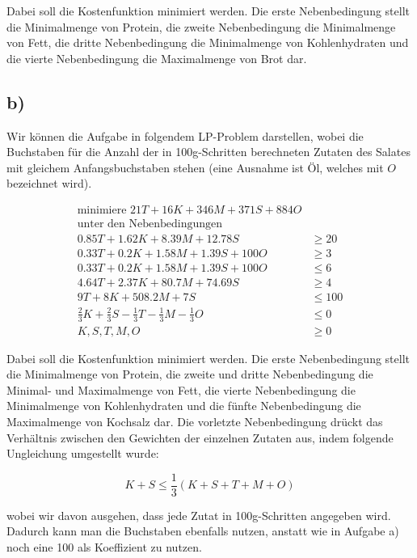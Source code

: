 \documentclass{article}
\begin{document}
Dabei soll die Kostenfunktion minimiert werden. Die erste Nebenbedingung stellt die Minimalmenge von Protein, die zweite Nebenbedingung die Minimalmenge von Fett, die dritte Nebenbedingung die Minimalmenge von Kohlenhydraten und die vierte Nebenbedingung die Maximalmenge von Brot dar.


\subsection*{b)}
Wir können die Aufgabe in folgendem LP-Problem darstellen, wobei die Buchstaben für die Anzahl der in 100g-Schritten berechneten Zutaten des Salates mit gleichem Anfangsbuchstaben stehen (eine Ausnahme ist Öl, welches mit $O$ bezeichnet wird).

\begin{align*}
	\text{minimiere } 21T + 16K + 346M + 371S + 884O\\
	\text{unter den Nebenbedingungen}\\
	0.85T + 1.62K + 8.39M + 12.78S &\geq 20\\
	0.33T + 0.2K + 1.58M + 1.39S + 100O &\geq 3\\
	0.33T + 0.2K + 1.58M + 1.39S + 100O &\leq 6\\
	4.64T + 2.37K + 80.7M + 74.69S &\geq 4\\
	9T + 8K + 508.2M + 7S &\leq 100\\
	\frac{2}{3}K + \frac{2}{3}S - \frac{1}{3}T - \frac{1}{3}M - \frac{1}{3}O &\leq 0\\
	K, S, T, M, O &\geq 0
\end{align*}

Dabei soll die Kostenfunktion minimiert werden. Die erste Nebenbedingung stellt die Minimalmenge von Protein, die zweite und dritte Nebenbedingung die Minimal- und Maximalmenge von Fett, die vierte Nebenbedingung die Minimalmenge von Kohlenhydraten und die fünfte Nebenbedingung die Maximalmenge von Kochsalz dar. Die vorletzte Nebenbedingung drückt das Verhältnis zwischen den Gewichten der einzelnen Zutaten aus, indem folgende Ungleichung umgestellt wurde:

$$K + S \leq \frac{1}{3}(K + S + T + M + O)$$

wobei wir davon ausgehen, dass jede Zutat in 100g-Schritten angegeben wird. Dadurch kann man die Buchstaben ebenfalls nutzen, anstatt wie in Aufgabe a) noch eine 100 als Koeffizient zu nutzen.
\end{document}
